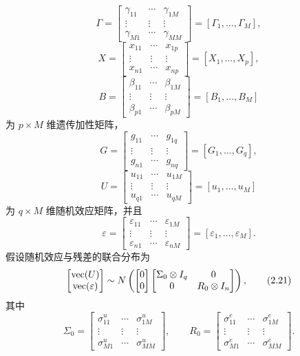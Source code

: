 \[
\Gamma=\begin{bmatrix}
\gamma_{11}&\cdots&\gamma_{1M}\\\vdots&\vdots&\vdots\\
\gamma_{M1}&\cdots&\gamma_{MM}
\end{bmatrix}=[\Gamma_1,\ldots,\Gamma_M],
\]
\[
X=\begin{bmatrix}
x_{11}&\cdots&x_{1p}\\\vdots&\vdots&\vdots\\x_{n1}&\cdots&x_{np}
\end{bmatrix}=[X_1,\ldots,X_p],
\]
\[
B=\begin{bmatrix}
\beta_{11}&\cdots&\beta_{1M}\\\vdots&\vdots&\vdots\\
\beta_{p1}&\cdots&\beta_{pM}
\end{bmatrix}=[B_1,\ldots,B_M]
\]
为 $p\times M$ 维遗传加性矩阵，
\[
G=\begin{bmatrix}
g_{11}&\cdots&g_{1q}\\\vdots&\vdots&\vdots\\g_{n1}&\cdots&g_{nq}
\end{bmatrix}=[G_1,\ldots,G_q],
\]
\[
U=\begin{bmatrix}
u_{11}&\cdots&u_{1M}\\\vdots&\vdots&\vdots\\u_{q1}&\cdots&u_{qM}
\end{bmatrix}=[u_1,\ldots,u_M]
\]
为 $q\times M$ 维随机效应矩阵，并且
\[
\varepsilon=\begin{bmatrix}
\varepsilon_{11}&\cdots&\varepsilon_{1M}\\\vdots&\vdots&\vdots\\
\varepsilon_{n1}&\cdots&\varepsilon_{nM}
\end{bmatrix}=[\varepsilon_1,\ldots,\varepsilon_M].
\]
假设随机效应与残差的联合分布为
\begin{equation}
\begin{bmatrix}\operatorname{vec}(U)\\\operatorname{vec}(\varepsilon)\end{bmatrix}
\sim N\left(
\begin{bmatrix}0\\0\end{bmatrix}
\begin{bmatrix}\Sigma_0\otimes I_q&0\\0&R_0\otimes I_n\end{bmatrix}
\right),
\tag{2.21}
\end{equation}
其中
\[
\Sigma_0=
\begin{bmatrix}
\sigma^u_{11}&\cdots&\sigma^u_{1M}\\\vdots&\vdots&\vdots\\
\sigma^u_{M1}&\cdots&\sigma^u_{MM}
\end{bmatrix},
\qquad
R_0=
\begin{bmatrix}
\sigma^e_{11}&\cdots&\sigma^e_{1M}\\\vdots&\vdots&\vdots\\
\sigma^e_{M1}&\cdots&\sigma^e_{MM}
\end{bmatrix}.
\]
